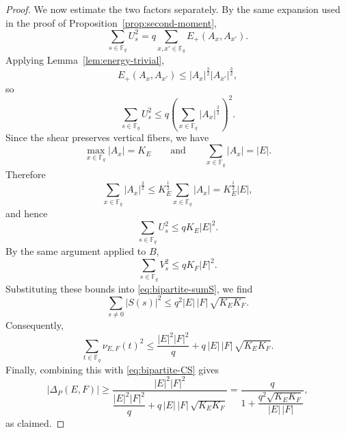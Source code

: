 \documentclass[10pt,a4paper]{amsart}
\newcommand{\F}{\mathbb{F}}
\newcommand{\abs}[1]{\left|#1\right|}
\begin{document}
\begin{proof}
We now estimate the two factors separately. By the same expansion used in the proof of
Proposition~\ref{prop:second-moment},
\[
\sum_{s\in\F_q}U_s^2
=
q\sum_{x,x'\in\F_q}E_+(A_x,A_{x'}).
\]
Applying Lemma~\ref{lem:energy-trivial},
\[
E_+(A_x,A_{x'})
\le
|A_x|^{\frac32}|A_{x'}|^{\frac32},
\]
so
\[
\sum_{s\in\F_q}U_s^2
\le
q\left(\sum_{x\in\F_q}|A_x|^{\frac32}\right)^2.
\]
Since the shear preserves vertical fibers, we have
\[
\max_{x\in\F_q}|A_x|=K_E
\qquad\text{and}\qquad
\sum_{x\in\F_q}|A_x|=|E|.
\]
Therefore
\[
\sum_{x\in\F_q}|A_x|^{\frac32}
\le
K_E^{\frac{1}{2}}\sum_{x\in\F_q}|A_x|
=
K_E^{\frac{1}{2}}|E|,
\]
and hence
\[
\sum_{s\in\F_q}U_s^2\le qK_E|E|^2.
\]
By the same argument applied to $B$,
\[
\sum_{s\in\F_q}V_s^2\le qK_F|F|^2.
\]
Substituting these bounds into \eqref{eq:bipartite-sumS}, we find
\[
\sum_{s\ne 0}|S(s)|^2
\le
q^2|E|\,|F|\,\sqrt{K_EK_F}.
\]
Consequently,
\[
\sum_{t\in\F_q}\nu_{E,F}(t)^2
\le
\frac{|E|^2|F|^2}{q}
+
q\,|E|\,|F|\,\sqrt{K_EK_F}.
\]
Finally, combining this with \eqref{eq:bipartite-CS} gives
\[
\abs{\Delta_P(E,F)}
\ge
\frac{|E|^2|F|^2}
{\dfrac{|E|^2|F|^2}{q}+q\,|E|\,|F|\,\sqrt{K_EK_F}}
=
\frac{q}{1+\dfrac{q^2\sqrt{K_EK_F}}{|E|\,|F|}},
\]
as claimed.
\end{proof}
\end{document}
